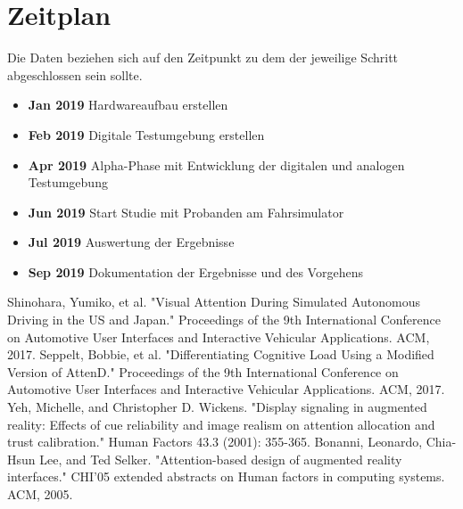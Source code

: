 \documentclass[a4paper, 11pt]{article}
\begin{document}
\section*{Zeitplan}
Die Daten beziehen sich auf den Zeitpunkt zu dem der jeweilige Schritt abgeschlossen sein sollte.
\begin{itemize}
    \item \textbf{Jan 2019} Hardwareaufbau erstellen
    \item \textbf{Feb 2019} Digitale Testumgebung erstellen
    \item \textbf{Apr 2019} Alpha-Phase mit Entwicklung der digitalen und analogen Testumgebung
    \item \textbf{Jun 2019} Start Studie mit Probanden am Fahrsimulator
    \item \textbf{Jul 2019} Auswertung der Ergebnisse
    \item \textbf{Sep 2019} Dokumentation der Ergebnisse und des Vorgehens
\end{itemize}

\begin{thebibliography}{9}
 Shinohara, Yumiko, et al. "Visual Attention During Simulated Autonomous Driving in the US and Japan." Proceedings of the 9th International Conference on Automotive User Interfaces and Interactive Vehicular Applications. ACM, 2017.
 Seppelt, Bobbie, et al. "Differentiating Cognitive Load Using a Modified Version of AttenD." Proceedings of the 9th International Conference on Automotive User Interfaces and Interactive Vehicular Applications. ACM, 2017.
 Yeh, Michelle, and Christopher D. Wickens. "Display signaling in augmented reality: Effects of cue reliability and image realism on attention allocation and trust calibration." Human Factors 43.3 (2001): 355-365.
 Bonanni, Leonardo, Chia-Hsun Lee, and Ted Selker. "Attention-based design of augmented reality interfaces." CHI'05 extended abstracts on Human factors in computing systems. ACM, 2005.
\end{thebibliography}
\end{document}
